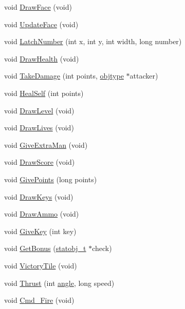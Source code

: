 \begin{DoxyCompactItemize}
\item 
void \hyperlink{WL__AGENT_8C_a8be593acb7e02c668d964d6042679fde}{DrawFace} (void)
\item 
void \hyperlink{WL__AGENT_8C_ac2f68a8b36dbfb20a38bc619c6622d16}{UpdateFace} (void)
\item 
void \hyperlink{WL__AGENT_8C_a05089437497aca93a4e4125cbfd96b80}{LatchNumber} (int x, int y, int width, long number)
\item 
void \hyperlink{WL__AGENT_8C_a72c88545eb3ce65cd96f2af4d7704f42}{DrawHealth} (void)
\item 
void \hyperlink{WL__AGENT_8C_a383b7b6dc8f0fe10dde5eeaeeb0e9b76}{TakeDamage} (int points, \hyperlink{structobjstruct}{objtype} $\ast$attacker)
\item 
void \hyperlink{WL__AGENT_8C_ad7b857c66f0f0e7bc7b961a9d2024538}{HealSelf} (int points)
\item 
void \hyperlink{WL__AGENT_8C_ae76d82b105193ca17991c489b709b57f}{DrawLevel} (void)
\item 
void \hyperlink{WL__AGENT_8C_aefc0a3d13bbeb119a08400ef0217dfb6}{DrawLives} (void)
\item 
void \hyperlink{WL__AGENT_8C_acb68c87a8a1dbcc48e7009f56d1dc7fe}{GiveExtraMan} (void)
\item 
void \hyperlink{WL__AGENT_8C_a5adcab0b538029aa93ac79c08adc129c}{DrawScore} (void)
\item 
void \hyperlink{WL__AGENT_8C_aced31f0edae6f9496d6d56942f318aba}{GivePoints} (long points)
\item 
void \hyperlink{WL__AGENT_8C_af3f3b9f79b56cd9e8e740e2ffd7522ab}{DrawKeys} (void)
\item 
void \hyperlink{WL__AGENT_8C_a4fcb6f04271d5008c0cb4c71fd02dcfe}{DrawAmmo} (void)
\item 
void \hyperlink{WL__AGENT_8C_ac83a75229c96c115e1391140ffe2de8a}{GiveKey} (int key)
\item 
void \hyperlink{WL__AGENT_8C_ae541a99035c0697e4b819dbe96f16a6a}{GetBonus} (\hyperlink{structstatstruct}{statobj\_\-t} $\ast$check)
\item 
void \hyperlink{WL__AGENT_8C_a9689cff3b028c2472976623b51e378fc}{VictoryTile} (void)
\item 
void \hyperlink{WL__AGENT_8C_ad49e33617f0da8e8ae3f643172eb39da}{Thrust} (int \hyperlink{WL__DRAW_8C_a63177970cacb40efba67ce501ea89210}{angle}, long speed)
\item 
void \hyperlink{WL__AGENT_8C_ae2ed34a82b25a60e89d3532c1f8fb70c}{Cmd\_\-Fire} (void)
\item 

\end{DoxyCompactItemize}
